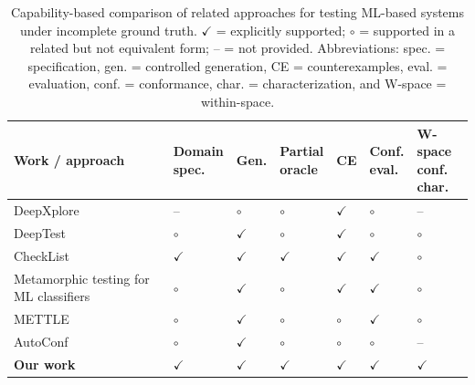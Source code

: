 \documentclass[preprint,12pt]{elsarticle}
\begin{document}
\begin{table}[t]
\centering
\caption{Capability-based comparison of related approaches for testing
ML-based systems under incomplete ground truth.
\(\checkmark\) = explicitly supported; \(\circ\) = supported in a related
but not equivalent form; -- = not provided. Abbreviations: spec. =
specification, gen. = controlled generation, CE = counterexamples, eval. =
evaluation, conf. = conformance, char. = characterization, and W-space =
within-space.}
\label{tab:related_work_capability_matrix}
\scriptsize
\setlength{\tabcolsep}{2.6pt}
\renewcommand{\arraystretch}{1.15}
\begin{tabular}{
p{}
>{\centering\arraybackslash}p{}
>{\centering\arraybackslash}p{}
>{\centering\arraybackslash}p{}
>{\centering\arraybackslash}p{}
>{\centering\arraybackslash}p{}
>{\centering\arraybackslash}p{}
}
\toprule
\textbf{Work / approach} &
\shortstack{\textbf{Domain}\\\textbf{spec.}} &
\textbf{Gen.} &
\shortstack{\textbf{Partial}\\\textbf{oracle}} &
\textbf{CE} &
\shortstack{\textbf{Conf.}\\\textbf{eval.}} &
\shortstack{\textbf{W-space}\\\textbf{conf.}\\\textbf{char.}} \\
\midrule

DeepXplore~\cite{pei2017deepxplore}
& -- & \(\circ\) & \(\circ\) & \(\checkmark\) & \(\circ\) & -- \\

DeepTest~\cite{tian2018deeptest}
& \(\circ\) & \(\checkmark\) & \(\circ\) & \(\checkmark\) & \(\circ\) & \(\circ\) \\

CheckList~\cite{ribeiro2020checklist}
& \(\checkmark\) & \(\checkmark\) & \(\checkmark\) & \(\checkmark\) &
\(\checkmark\) & \(\circ\) \\

Metamorphic testing for ML classifiers~\cite{xie2011metamorphicML}
& \(\circ\) & \(\checkmark\) & \(\circ\) & \(\checkmark\) &
\(\checkmark\) & \(\circ\) \\

METTLE~\cite{xie2020mettle}
& \(\circ\) & \(\checkmark\) & \(\circ\) & \(\circ\) &
\(\checkmark\) & \(\circ\) \\

AutoConf~\cite{shar2023autoconf}
& \(\circ\) & \(\checkmark\) & \(\circ\) & \(\circ\) &
\(\circ\) & -- \\

\textbf{Our work}
& \(\checkmark\) & \(\checkmark\) & \(\checkmark\) & \(\checkmark\) &
\(\checkmark\) & \(\checkmark\) \\

\bottomrule
\end{tabular}
\end{table}
\end{document}
